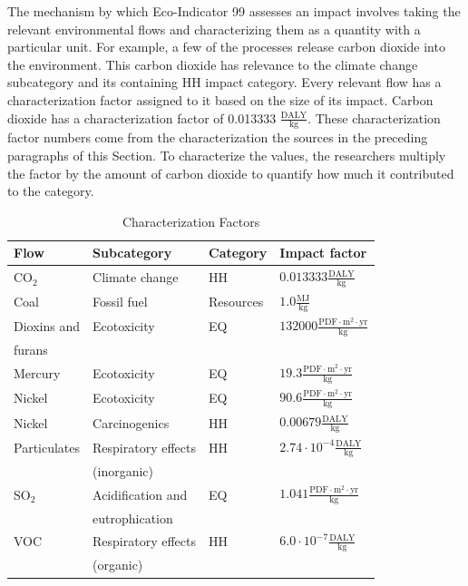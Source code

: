 \documentclass[final,journal,10pt,letterpaper,oneside,twocolumn,compsoc]%
{IEEEtran}
\begin{document}
The mechanism by which Eco-Indicator 99 assesses an impact involves taking the
relevant environmental flows and characterizing them as a quantity with a
particular unit. For
example, a few of the processes release carbon dioxide into the environment.
This carbon dioxide has relevance to the
climate change subcategory and its containing HH impact category.
Every relevant flow has a
characterization factor assigned to it based on the size of its impact. Carbon dioxide has
a characterization factor of 0.013333 $\frac{\textrm{DALY}}{\textrm{kg}}$.
These
characterization factor numbers come from the characterization the sources in
the preceding paragraphs of this Section.
To characterize the values, the researchers multiply the factor by the amount
of carbon dioxide to quantify how much it contributed to the category. 

\begin{table}[htbp]
  \caption{Characterization Factors}
  \label{tab:8}
  \centering
    \begin{tabular}{| l | l | l | l |}
      \hline
      Flow & Subcategory & Category & Impact factor \\
      \hline
      CO$_2$   & Climate change  & HH      & 
        $0.013333 \frac{\textrm{DALY}}{\textrm{kg}}$ \\
      Coal & Fossil fuel     & Resources          &
        $1.0 \frac{\textrm{MJ}}{\textrm{kg}}$ \\
      Dioxins and & Ecotoxicity & EQ & $132000 \frac{\textrm{
        PDF} \cdot \textrm{m}^2 \cdot \textrm{yr}}{\textrm{kg}}$ \\
        \hspace{5mm} furans & & &  \\
      Mercury & Ecotoxicity & EQ & $19.3 \frac{\textrm{PDF} \cdot
        \textrm{m}^2 \cdot \textrm{yr}}{\textrm{kg}}$ \\
      Nickel  & Ecotoxicity & EQ & $90.6 \frac{\textrm{PDF} \cdot
        \textrm{m}^2 \cdot \textrm{yr}}{\textrm{kg}}$ \\
      Nickel  & Carcinogenics & HH &
        $0.00679 \frac{\textrm{DALY}}{\textrm{kg}}$ \\
      Particulates & Respiratory effects      & HH &
        $2.74 \cdot 10^{-4} \frac{\textrm{DALY}}{\textrm{kg}}$ \\
                   & \hspace{5mm} (inorganic) &              &  \\
      SO$_2$ & Acidification and & EQ & $1.041 \frac{
        \textrm{PDF} \cdot \textrm{m}^2 \cdot \textrm{yr}}{\textrm{kg}}$ \\
                     & \hspace{5mm} eutrophication & & \\
      VOC & Respiratory effects & HH &
        $6.0 \cdot 10^{-7} \frac{\textrm{DALY}}{\textrm{kg}}$ \\
          & \hspace{5mm} (organic) & &  \\
      \hline
    \end{tabular}
\end{table}
\end{document}

